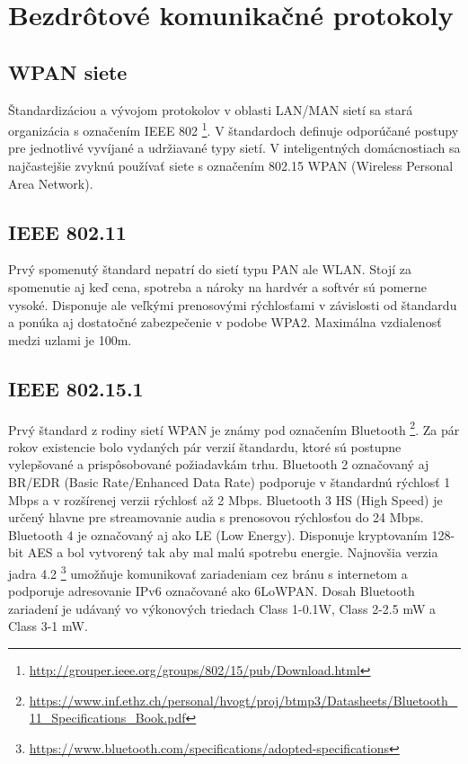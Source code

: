 \documentclass[12pt,a4paper,oneside,openright]{report}
\begin{document}
\section{Bezdrôtové komunikačné protokoly} \label{s_protocols}
\subsection{WPAN siete}
Štandardizáciou a vývojom protokolov v oblasti LAN/MAN sietí sa stará organizácia s označením IEEE
802 \footnote{\url{http://grouper.ieee.org/groups/802/15/pub/Download.html}}. V štandardoch definuje odporúčané postupy pre jednotlivé vyvíjané a udržiavané typy sietí. V
inteligentných domácnostiach sa najčastejšie zvyknú používať siete s označením 802.15 WPAN (Wireless Personal Area Network).
\subsection{IEEE 802.11}
Prvý spomenutý štandard nepatrí do sietí typu PAN ale WLAN. Stojí za spomenutie aj keď cena, spotreba a nároky na hardvér a softvér sú pomerne vysoké. Disponuje ale veľkými prenosovými rýchlosťami v závislosti od štandardu a ponúka aj dostatočné zabezpečenie v podobe WPA2. Maximálna vzdialenosť medzi uzlami je 100m. 
\subsection{IEEE 802.15.1}
Prvý štandard z rodiny sietí WPAN je známy pod označením Bluetooth
\footnote{\url{https://www.inf.ethz.ch/personal/hvogt/proj/btmp3/Datasheets/Bluetooth_11_Specifications_Book.pdf}}. Za pár rokov existencie bolo vydaných pár verzií štandardu, ktoré sú postupne vylepšované a prispôsobované požiadavkám trhu.
Bluetooth 2 označovaný aj BR/EDR (Basic Rate/Enhanced Data Rate) podporuje v štandardnú rýchlosť 1 Mbps a v rozšírenej verzii rýchlosť až 2 Mbps.
Bluetooth 3 HS (High Speed) je určený hlavne pre streamovanie audia s prenosovou rýchlosťou do 24 Mbps.
Bluetooth 4 je označovaný aj ako LE (Low Energy). Disponuje kryptovaním 128-bit AES a bol vytvorený tak aby mal malú spotrebu energie. Najnovšia verzia jadra 4.2 \footnote{\url{https://www.bluetooth.com/specifications/adopted-specifications}} umožňuje komunikovať zariadeniam cez bránu s internetom a podporuje adresovanie IPv6 označované ako 6LoWPAN.
Dosah Bluetooth zariadení je udávaný vo výkonových triedach Class 1-0.1W, Class 2-2.5 mW a Class 3-1 mW.
\end{document}
